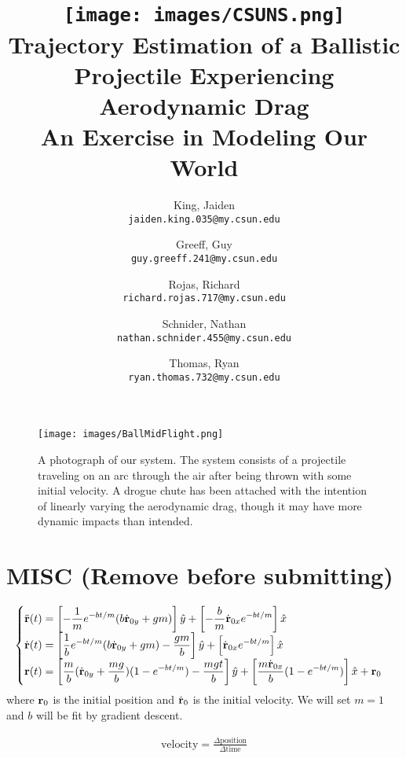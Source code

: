\documentclass[12pt,english]{report}
\author{
	King, Jaiden\\
	\texttt{jaiden.king.035@my.csun.edu}
	\and
	Greeff, Guy\\
	\texttt{guy.greeff.241@my.csun.edu}
	\and
	Rojas, Richard\\
	\texttt{richard.rojas.717@my.csun.edu}
	\and
	Schnider, Nathan\\
	\texttt{nathan.schnider.455@my.csun.edu}
	\and
	Thomas, Ryan\\
	\texttt{ryan.thomas.732@my.csun.edu}
}
\title{\texttt{[image: images/CSUNS.png]}\\
Trajectory Estimation of a Ballistic Projectile Experiencing Aerodynamic Drag\\\large{An Exercise in Modeling Our World}}
\begin{document}
\maketitle

\tableofcontents

\begin{figure}[t]
\centering
\texttt{[image: images/BallMidFlight.png]}
\caption{\label{fig:BallMidFlight} A photograph of our system. The system consists of a projectile traveling on an arc through the air after being thrown with some initial velocity. A drogue chute has been attached with the intention of linearly varying the aerodynamic drag, though it may have more dynamic impacts than intended.}
\end{figure}














\section{MISC (Remove before submitting)}


\newpage
\begin{align*}
\begin{cases} 
\displaystyle \ddot{\bf r}(t) = \left[-\frac{1}{m}e^{-bt/m}(b\dot{\bf r}_{0y}+gm)\right]\hat{y} + \left[-\frac{b}{m}\dot{\bf r}_{0x}e^{-bt/m}\right]\hat{x} 
\\
\displaystyle \dot{\bf r}(t) = \left[\frac{1}{b}e^{-bt/m}(b\dot{\bf r}_{0y}+gm)-\frac{gm}{b}\right]\hat{y} + \left[\dot{\bf r}_{0x}e^{-bt/m}\right]\hat{x} 
\\
\displaystyle {\bf r}(t) = \left[\frac{m}{b}(\dot{\bf r}_{0y}+\frac{mg}{b})(1-e^{-bt/m})-\frac{mgt}{b}\right]\hat{y} + \left[\frac{m\dot{\bf r}_{0x}}{b}(1-e^{-bt/m})\right]\hat{x} + {\bf r}_0
\end{cases}
\end{align*}
where ${\bf r}_0$ is the initial position and $\dot{\bf r}_0$ is the initial velocity. We will set $m=1$ and $b$ will be fit by gradient descent.

\begin{align*}
\text{velocity} = \frac{\Delta \text{position}}{\Delta \text{time}}
\end{align*}
\end{document}
